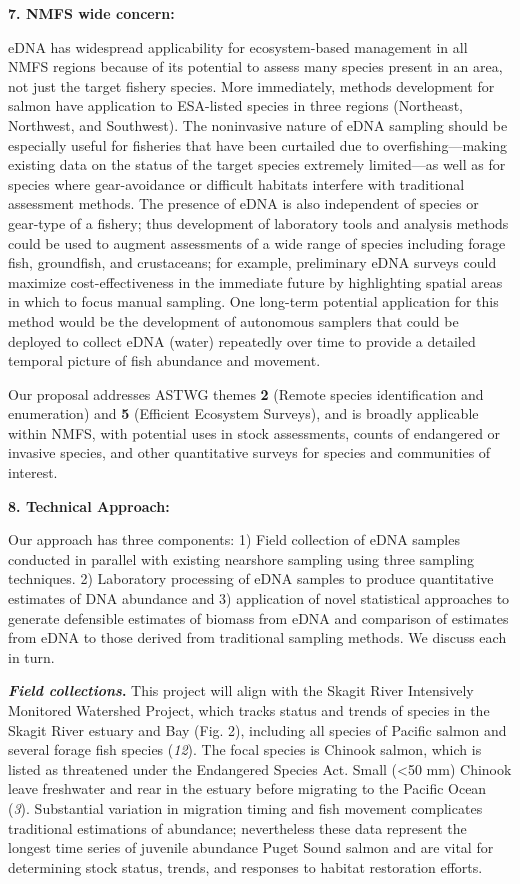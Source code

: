 \documentclass[]{article}
\begin{document}
\textbf{7. NMFS wide concern:}{~}

eDNA has widespread applicability for ecosystem-based management in all
NMFS regions because of its potential to assess many species present in
an area, not just the target fishery species. More immediately, methods
development for salmon have application to ESA-listed species in three
regions (Northeast, Northwest, and Southwest). The noninvasive nature of
eDNA sampling should be especially useful for fisheries that have been
curtailed due to overfishing---making existing data on the status of the
target species extremely limited---as well as for species where
gear-avoidance or difficult habitats interfere with traditional
assessment methods. The presence of eDNA is also independent of species
or gear-type of a fishery; thus development of laboratory tools and
analysis methods could be used to augment assessments of a wide range of
species including forage fish, groundfish, and crustaceans; for example,
preliminary eDNA surveys could maximize cost-effectiveness in the
immediate future by highlighting spatial areas in which to focus manual
sampling. One long-term potential application for this method would be
the development of autonomous samplers that could be deployed to collect
eDNA (water) repeatedly over time to provide a detailed temporal picture
of fish abundance and movement. {~}

Our proposal addresses ASTWG themes \textbf{2} (Remote species
identification and enumeration) and \textbf{5} (Efficient Ecosystem
Surveys), and is broadly applicable within NMFS, with potential uses in
stock assessments, counts of endangered or invasive species, and other
quantitative surveys for species and communities of interest.

\textbf{8. Technical Approach:}

Our approach has three components: 1) Field collection of eDNA samples
conducted in parallel with existing nearshore sampling using three
sampling techniques. 2) Laboratory processing of eDNA samples to produce
quantitative estimates of DNA abundance and 3) application of novel
statistical approaches to generate defensible estimates of biomass from
eDNA and comparison of estimates from eDNA to those derived from
traditional sampling methods. We discuss each in turn.

\textbf{\emph{Field collections}.} This project will align with the
Skagit River Intensively Monitored Watershed Project, which tracks
status and trends of species in the Skagit River estuary and Bay (Fig.
2), including all species of Pacific salmon and several forage fish
species (\emph{12}). The focal species is Chinook salmon, which is
listed as threatened under the Endangered Species Act. Small
(\textless{}50 mm) Chinook leave freshwater and rear in the estuary
before migrating to the Pacific Ocean (\emph{3}). Substantial variation
in migration timing and fish movement complicates traditional
estimations of abundance; nevertheless these data represent the longest
time series of juvenile abundance Puget Sound salmon and are vital for
determining stock status, trends, and responses to habitat restoration
efforts.{~}
\end{document}
